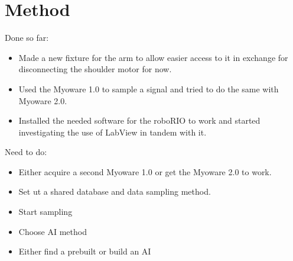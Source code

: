 \section{Method}
\label{section:method}





Done so far: 

\begin{itemize}
    
    \item Made a new fixture for the arm to allow easier access to it in exchange for disconnecting the shoulder motor for now.
    
    \item Used the Myoware 1.0 to sample a signal and tried to do the same with Myoware 2.0.
    
    \item Installed the needed software for the roboRIO to work and started investigating the use of LabView in tandem with it.
    
\end{itemize}
Need to do:
\begin{itemize}
    \item Either acquire a second Myoware 1.0 or get the Myoware 2.0 to work.
    
    \item Set ut a shared database and data sampling method.
    
    \item Start sampling
    
    \item Choose AI method
    
    \item Either find a prebuilt or build an AI
\end{itemize}